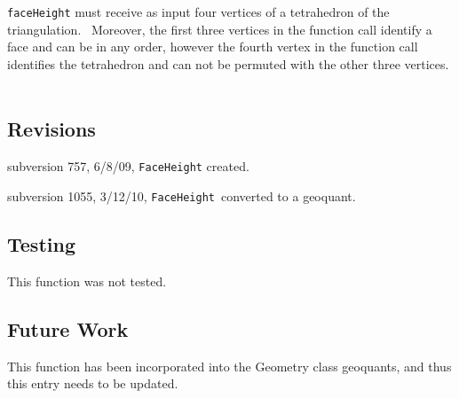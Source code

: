 \texttt{faceHeight} must receive as input four vertices of a tetrahedron of
the triangulation. \ Moreover, the first three vertices in the function call
identify a face and can be in any order, however the fourth vertex in the
function call identifies the tetrahedron and can not be permuted with the
other three vertices. \ 

\subsection*{Revisions}

subversion 757, 6/8/09, \texttt{FaceHeight} created.

subversion 1055, 3/12/10, \texttt{FaceHeight}\ converted to a geoquant.

\subsection*{Testing}

This function was not tested.

\subsection*{Future Work}

This function has been incorporated into the Geometry class geoquants, and
thus this entry needs to be updated. \ 
